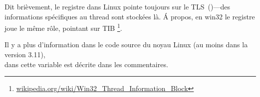 Dit brièvement, le registre  dans Linux pointe toujours sur le
\ac{TLS}~()---des informations spécifiques au thread sont stockées là.
Á propos, en win32 le registre  joue le même rôle, pointant sur \ac{TIB}
\footnote{\href{http://go.yurichev.com/17104}{wikipedia.org/wiki/Win32\_Thread\_Information\_Block}}.

Il y a plus d'information dans le code source du noyau Linux (au moins dans la version 3.11),\\
dans  cette variable est décrite dans les commentaires.



